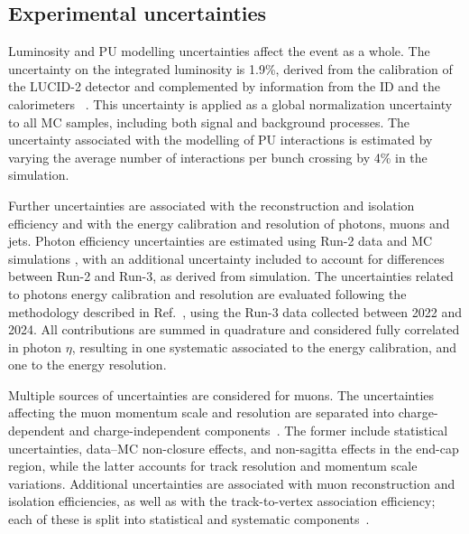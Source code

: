\subsection{Experimental uncertainties}
Luminosity and PU modelling uncertainties affect the event as a whole. The uncertainty on the integrated luminosity is 1.9\%, derived from the calibration of the LUCID-2 detector and complemented by information from the ID and the calorimeters ~\cite{ATL-DAPR-PUB-2023-001}. This uncertainty is applied as a global normalization uncertainty to all MC samples, including both signal and background processes. The uncertainty associated with the modelling of PU interactions is estimated by varying the average number of interactions per bunch crossing by 4\% in the simulation.    

Further uncertainties are associated with the reconstruction and isolation efficiency and with the energy calibration and resolution of photons, muons and jets.   Photon efficiency uncertainties are estimated using Run-2 data and MC simulations \cite{EGAM-2018-01}, with an additional uncertainty included to account for differences between Run-2 and Run-3, as derived from simulation. The uncertainties related to photons energy calibration and resolution are evaluated following the methodology described in Ref.~\cite{PERF-2017-03}, using the Run-3 data collected between 2022 and 2024. All contributions are summed in quadrature and considered fully correlated in photon $\eta$, resulting in one systematic associated to the energy calibration, and one to the energy resolution. 

Multiple sources of uncertainties are considered for muons. The uncertainties affecting the muon momentum scale and resolution are separated into charge-dependent and charge-independent components~\cite{MUON-2018-03}. The former include statistical uncertainties, data--MC non-closure effects, and non-sagitta effects in the end-cap region, while the latter accounts for track resolution and momentum scale variations. Additional uncertainties are associated with muon reconstruction and isolation efficiencies, as well as with the track-to-vertex association efficiency; each of these is split into statistical and systematic components~\cite{PERF-2015-10}. 

